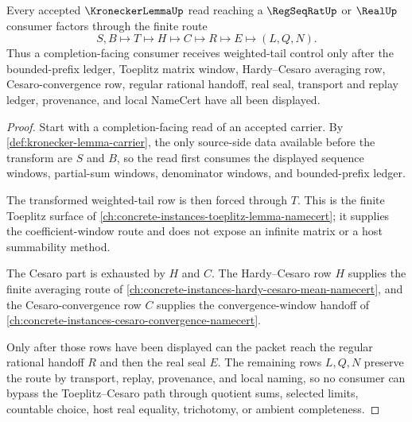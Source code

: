 \begin{theorem}\label{thm:kronecker-lemma-toeplitz-cesaro-route}
Every accepted $\KroneckerLemmaUp$ read reaching a $\RegSeqRatUp$ or $\RealUp$ consumer factors through the finite route
$$
S,B\longmapsto T\longmapsto H\longmapsto C\longmapsto R\longmapsto E\longmapsto (L,Q,N).
$$
Thus a completion-facing consumer receives weighted-tail control only after the bounded-prefix ledger, Toeplitz matrix window, Hardy--Cesaro averaging row, Cesaro-convergence row, regular rational handoff, real seal, transport and replay ledger, provenance, and local NameCert have all been displayed.
\end{theorem}
\begin{proof}
Start with a completion-facing read of an accepted carrier. By \autoref{def:kronecker-lemma-carrier}, the only source-side data available before the transform are $S$ and $B$, so the read first consumes the displayed sequence windows, partial-sum windows, denominator windows, and bounded-prefix ledger.

The transformed weighted-tail row is then forced through $T$. This is the finite Toeplitz surface of \autoref{ch:concrete-instances-toeplitz-lemma-namecert}; it supplies the coefficient-window route and does not expose an infinite matrix or a host summability method.

The Cesaro part is exhausted by $H$ and $C$. The Hardy--Cesaro row $H$ supplies the finite averaging route of \autoref{ch:concrete-instances-hardy-cesaro-mean-namecert}, and the Cesaro-convergence row $C$ supplies the convergence-window handoff of \autoref{ch:concrete-instances-cesaro-convergence-namecert}.

Only after those rows have been displayed can the packet reach the regular rational handoff $R$ and then the real seal $E$. The remaining rows $L,Q,N$ preserve the route by transport, replay, provenance, and local naming, so no consumer can bypass the Toeplitz--Cesaro path through quotient sums, selected limits, countable choice, host real equality, trichotomy, or ambient completeness.
\end{proof}


